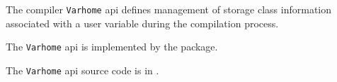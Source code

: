 
The compiler {\tt Varhome} api defines management of storage class information associated 
with a user variable during the compilation process.

The {\tt Varhome} api is implemented by the  package.

The {\tt Varhome} api source code is in .

